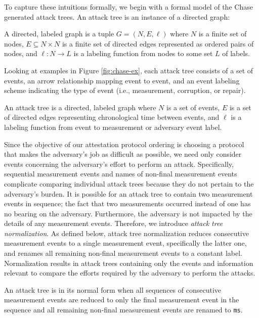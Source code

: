 \documentclass[runningheads]{llncs}
\theoremstyle{definition}
\begin{document}
To capture these intuitions formally, we begin with a formal model of
the Chase generated attack trees. An attack tree is an instance of a
directed graph:

\begin{definition}
    A directed, labeled graph is a tuple $G = (N, E, \ell)$ where $N$
    is a finite set of nodes, $E \subseteq N \times N$ is a finite set
    of directed edges represented as ordered pairs of nodes, and $\ell
    : N \rightarrow L$ is a labeling function from nodes to some set
    $L$ of labels. 
\end{definition} 
 
\noindent Looking at examples in Figure \ref{fig:chase-ex}, each
attack tree consists of a set of events, an arrow relationship mapping
event to event, and an event labeling scheme indicating the type of
event (i.e., measurement, corruption, or repair).

\begin{definition}
    An attack tree is a directed, labeled graph where $N$ is a set of
    events, $E$ is a set of directed edges representing chronological
    time between events, and $\ell$ is a labeling function from event
    to measurement or adversary event label. 
\end{definition}

Since the objective of our attestation protocol ordering is choosing a
protocol that makes the adversary’s job as difficult as possible, we
need only consider events concerning the adversary's effort to perform
an attack. Specifically, sequential measurement events and names of
non-final measurement events complicate comparing individual attack
trees because they do not pertain to the adversary's burden. It is
possible for an attack tree to contain two measurement events in
sequence; the fact that two measurements occurred instead of one has
no bearing on the adversary. Furthermore, the adversary is not
impacted by the details of any measurement events.  Therefore, we
introduce \emph{attack tree normalization}. As defined below, attack
tree normalization reduces consecutive measurement events to a single
measurement event, specifically the latter one, and renames all
remaining non-final measurement events to a constant label.
Normalization results in attack trees containing only the events and
information relevant to compare the efforts required by the adversary
to perform the attacks.

\begin{definition}
    An attack tree is in its normal form when all sequences of
    consecutive measurement events are reduced to only the final
    measurement event in the sequence and all remaining non-final
    measurement events are renamed to \texttt{ms}.  
\end{definition}
\end{document}
